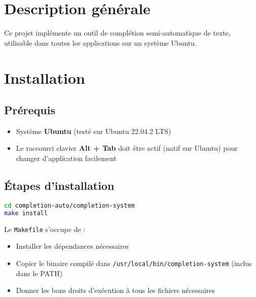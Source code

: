 


% 


\section*{Description générale}

Ce projet implémente un outil de complétion semi-automatique de texte, utilisable dans toutes les applications sur un système Ubuntu.

\section*{Installation}

\subsection*{Prérequis}

\begin{itemize}
	\item Système \textbf{Ubuntu} (testé sur Ubuntu 22.04.2 LTS)
	\item Le raccourci clavier \textbf{Alt + Tab} doit être actif (natif sur Ubuntu) pour changer d'application facilement
\end{itemize}

\subsection*{Étapes d'installation}

\begin{lstlisting}[language=bash]
cd completion-auto/completion-system
make install
\end{lstlisting}

Le \texttt{Makefile} s’occupe de :
\begin{itemize}
	\item Installer les dépendances nécessaires
	\item Copier le binaire compilé dans \texttt{/usr/local/bin/completion-system} (inclus dans le PATH)
	\item Donner les bons droits d’exécution à tous les fichiers nécessaires
\end{itemize}

